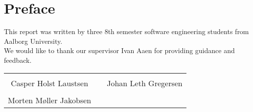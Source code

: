 \thispagestyle{empty}
\section*{Preface}
This report was written by three 8th semester software engineering students from Aalborg University.\\

\vspace{.2cm}
\noindent We would like to thank our supervisor Ivan Aaen for providing guidance and feedback.

\begin{table}[H]
	\centering
	\vspace{2cm}
		\begin{tabular}{c c c}
			\underline{\phantom{JAERJAERJAERJAERGO}} & \phantom{cookies} & \underline{\phantom{JAERJAERJAERJAERGO}} \\
			Casper Holst Laustsen & \phantom{cookies} & Johan Leth Gregersen\\[1.5cm]
		    \underline{\phantom{JAERJAERJAERJAERGO}} & \phantom{cookies} & {\phantom{JAERJAERJAERJAERGO}} \\
			Morten Møller Jakobsen & \phantom{cookies} & \\[1.5cm]				
		\end{tabular}
\end{table}
